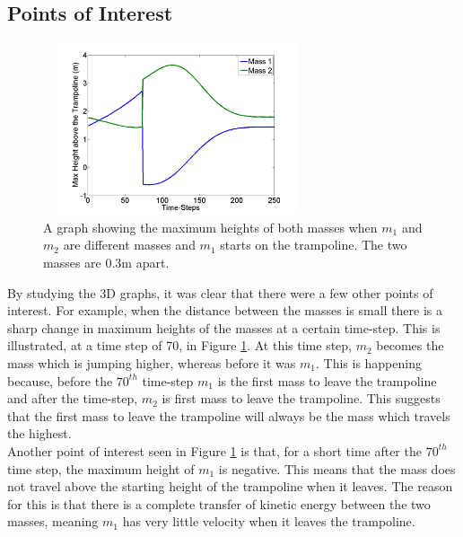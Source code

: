 



\subsection{Points of Interest}

\begin{figure}[H]
	\centering
	\includegraphics[width=3.1in, height=2in]{points_of_interest.png}
    \caption{A graph showing the maximum heights of both masses when $m_1$ and $m_2$ are different masses and $m_1$ starts on the trampoline. The two masses are 0.3m apart.}\label{fig:poi}
\end{figure}

\noindent By studying the 3D graphs, it was clear that there were a few other points of interest. For example, when the distance between the masses is small there is a sharp change in maximum heights of the masses at a certain time-step. This is illustrated, at a time step of 70, in Figure \ref{fig:poi}. At this time step, $m_2$ becomes the mass which is jumping higher, whereas before it was $m_1$. This is happening because, before the $70^{th}$ time-step $m_1$ is the first mass to leave the trampoline and after the time-step, $m_2$ is first mass to leave the trampoline. This suggests that the first mass to leave the trampoline will always be the mass which travels the highest. \\

\noindent Another point of interest seen in Figure \ref{fig:poi} is that, for a short time after the $70^{th}$ time step, the maximum height of $m_1$ is negative. This means that the mass does not travel above the starting height of the trampoline when it leaves. The reason for this is that there is a complete transfer of kinetic energy between the two masses, meaning $m_1$ has very little velocity when it leaves the trampoline.




